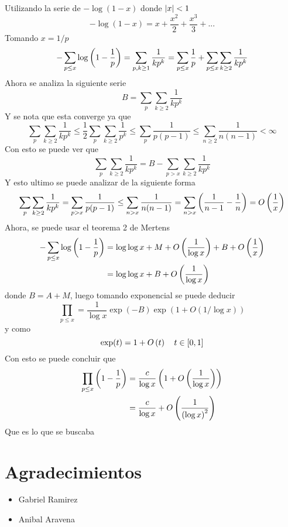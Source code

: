 \begin{sol}
	Utilizando la serie de $-\log (1-x)$ donde $\left|x\right|<1$
	\[-\log (1-x)=x+\frac{x^2}2+\frac{x^3}3+...\]
	Tomando $x=1/p$
	\[-\sum_{p\leq x}\log\left(1-\frac1p\right)=\sum_{p,k\geq1}\frac1{kp^k}=\sum_{p\leq x}\frac1p+\sum_{p\leq x}\sum_{k\geq2}\frac1{kp^k}\]
	Ahora se analiza la siguiente serie
	\[B=\sum_p\sum_{k\geq2}\frac1{kp^k}\]
	Y se nota que esta converge ya que
	\[\sum_p\sum_{k\geq2}\frac1{kp^k}\leq\frac12\sum_p\sum_{k\geq2}\frac1{p^k}\leq\sum_p\frac1{p(p-1)}\leq\sum_{n\geq2}\frac1{n(n-1)}<\infty\]
	Con esto se puede ver que
	\[\sum_p\sum_{k\geq2}\frac1{kp^k}=B-\sum_{p>x}\sum_{k\geq2}\frac1{kp^k}\]
	Y esto ultimo se puede analizar de la siguiente forma
	\[\sum_p\sum_{k\geq2}\frac1{kp^k}=\sum_{p>x}\frac1{p(p-1)}\leq\sum_{n>x}\frac1{n(n-1)}=\sum_{n>x}\left(\frac1{n-1}-\frac1n\right)=O\left(\frac1x\right)\]
	Ahora, se puede usar el teorema 2 de Mertens
	\begin{align*}
		-\sum_{p\leq x}\log\left(1-\frac1p\right) & =\log\log x+M+O\left(\frac1{\log x}\right)+B+O\left(\frac1x\right) \\
		                                     & =\log\log x+B+O\left(\frac1{\log x}\right)
	\end{align*}
	donde $B=A+M$, luego tomando exponencial se puede deducir
	\[\prod_{p\leq x}=\frac1{\log x}\exp(-B)\exp(1+O(1/\log x))\]
	y como
	\[\exp(t)=1+O\left(t\right)\quad t\in[0,1]\]
	Con esto se puede concluir que
	\begin{align*}
		\prod_{p\leq x}\left(1-\frac1p\right) & =\frac{c}{\log x}\left(1+O\left(\frac1{\log x}\right)\right)  \\
		                                 & =\frac{c}{\log x}+O\left(\frac1{\left(\log x\right)^2}\right)
	\end{align*}
	Que es lo que se buscaba\cite{mertens3}
\end{sol}

\section{Agradecimientos}
\begin{multicols}{2}
	\begin{itemize}
		\item Gabriel Ramirez

		\item Anibal Aravena
	\end{itemize}
\end{multicols}




